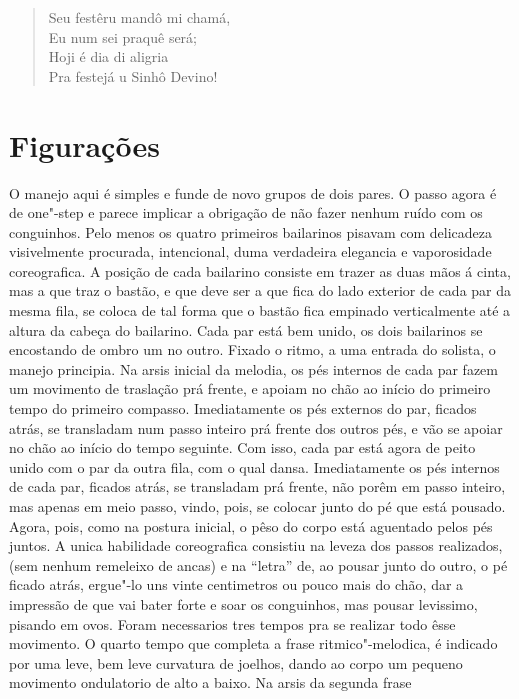 \begin{verse}
Seu festêru mandô mi chamá,\\
Eu num sei praquê será;\\
Hoji é dia di aligria\\
Pra festejá u Sinhô Devino!
\end{verse}

\section{Figurações}

O manejo aqui é simples e funde de novo grupos de dois pares. O passo
agora é de one"-step e parece implicar a obrigação de não fazer nenhum
ruído com os conguinhos. Pelo menos os quatro primeiros bailarinos
pisavam com delicadeza visivelmente procurada, intencional, duma
verdadeira elegancia e vaporosidade coreografica. A posição de cada
bailarino consiste em trazer as duas mãos á cinta, mas a que traz o
bastão, e que deve ser a que fica do lado exterior de cada par da mesma
fila, se coloca de tal forma que o bastão fica empinado verticalmente
até a altura da cabeça do bailarino. Cada par está bem unido, os dois
bailarinos se encostando de ombro um no outro. Fixado o ritmo, a uma
entrada do solista, o manejo principia. Na arsis inicial da melodia, os
pés internos de cada par fazem um movimento de traslação prá frente, e
apoiam no chão ao início do primeiro tempo do primeiro compasso.
Imediatamente os pés externos do par, ficados atrás, se transladam num
passo inteiro prá frente dos outros pés, e vão se apoiar no chão ao
início do tempo seguinte. Com isso, cada par está agora de peito unido
com o par da outra fila, com o qual dansa. Imediatamente os pés internos
de cada par, ficados atrás, se transladam prá frente, não porêm em passo
inteiro, mas apenas em meio passo, vindo, pois, se colocar junto do pé
que está pousado. Agora, pois, como na postura inicial, o pêso do corpo
está aguentado pelos pés juntos. A unica habilidade coreografica
consistiu na leveza dos passos realizados, (sem nenhum remeleixo de
ancas) e na ``letra'' de, ao pousar junto do outro, o pé ficado atrás,
ergue"-lo uns vinte centimetros ou pouco mais do chão, dar a impressão de
que vai bater forte e soar os conguinhos, mas pousar levissimo, pisando
em ovos. Foram necessarios tres tempos pra se realizar todo êsse
movimento. O quarto tempo que completa a frase ritmico"-melodica, é
indicado por uma leve, bem leve curvatura de joelhos, dando ao corpo um
pequeno movimento ondulatorio de alto a baixo. Na arsis da segunda frase
